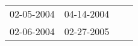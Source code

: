 \begin{supertabular}{llll}
 02-05-2004 &  04-14-2004 \\
 02-06-2004 &  02-27-2005 \\
\end{supertabular}
